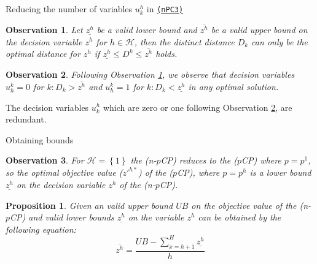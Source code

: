 \documentclass[utf8,aspectratio=1610,ngerman,english]{beamer}
\newtheorem{observation}{Observation}
\newtheorem{proposition}{Proposition}
\newcommand{\nPCE}{\hyperref[eq:nPCE]{\texttt{(nPC3)}}\xspace}
\newcommand{\pCP}{($p$CP)\xspace}
\newcommand{\npCP}{(n-$p$CP)\xspace}
\begin{document}
\begin{frame}{Reducing the number of variables $u_k^h$ in \nPCE} \pause
    \begin{observation}\label{obs:bounds}
        \vspace{-8pt}
        Let $\underline{z^h}$ be a valid lower bound and $\overline{z^h}$ be a valid upper bound on the decision variable $z^h$ for $h \in \mathcal H$, then
        the distinct distance $D_k$ can only be the optimal distance for $z^h$ if $\underline{z^h} \leq D^k \leq \overline{z^h}$ holds.
    \end{observation}
    \begin{observation}\label{obs:setVariables}
        \vspace{-8pt}
        Following Observation \ref{obs:bounds}, we observe that decision variables $u_h^k = 0$ for $k: D_k > \overline{z^h}$ and $u_h^k = 1$ for $k: D_k < \underline{z^h}$ in any optimal solution.
    \end{observation}
    \vspace{-10pt}\pause
    \begin{block}{\vspace{-20pt}}\label{prop:reduceVariables}
        \vspace{-6pt}
        The decision variables $u_k^h$ which are zero or one following Observation \ref{obs:setVariables}, are redundant.
    \end{block}
\end{frame}

\begin{frame}{Obtaining bounds} \pause
    \begin{observation}
        For $\mathcal{H} = \left\{1\right\}$ the \npCP reduces to the \pCP where $p = p^1$, so the optimal objective value (${z'}^{h*}$) of the \pCP, where $p = p^h$ is a lower bound $\underline{z^h}$
        on the decision variable $z^h$ of the \npCP.
    \end{observation}\pause
    \begin{proposition}
        Given an valid upper bound $UB$ on the objective value of the \npCP and valid lower bounds $\underline{z^h}$ on the variable $z^h$ can be obtained by the following equation:
        \begin{equation}
            \overline{z^h} = \frac{UB - \sum_{x = h+1}^{H}\underline{z^h}}{h}
        \end{equation}
    \end{proposition} %
\end{frame}
\end{document}
